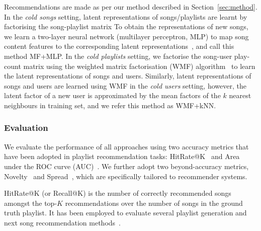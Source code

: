 \begin{itemize}
      Recommendations are made as per our method described in Section~\ref{sec:method}.
      In the \emph{cold songs} setting, latent representations of songs/playlists are learnt by factorising the song-playlist matrix  
      To obtain the representations of new songs, we learn a two-layer neural network (multilayer perceptron, MLP) to map song 
      content features to the corresponding latent representations~\cite{gantner2010learning,van2013deep}, and call this method MF+MLP. 
      In the \emph{cold playlists} setting, we factorise the song-user play-count matrix using the weighted matrix factorisation (WMF) 
      algorithm~\cite{hu2008collaborative,van2013deep} to learn the latent representations of songs and users.
      Similarly, latent representations of songs and users are learned using WMF in the \emph{cold users} setting, however, the latent 
      factor of a new user is approximated by the mean factors of the $k$ nearest neighbours in training set, 
      and we refer this method as WMF+kNN.
\end{itemize}


\subsubsection{Evaluation}
We evaluate the performance of all approaches using two accuracy metrics that have been adopted 
in playlist recommendation tasks:
HitRate@K~\cite{hariri2012context} and Area under the ROC curve (AUC)~\cite{manning2008introIR}.
We further adopt two beyond-accuracy metrics, \ie
Novelty~\cite{zhang2012auralist,schedl2017} and Spread~\cite{kluver2014evaluating},
which are specifically tailored to recommender systems.
%

HitRate@K (or Recall@K) is the number of correctly recommended songs amongst the top-$K$ recommendations over
the number of songs in the ground truth playlist. %
It has been employed to evaluate several playlist generation and next song recommendation
methods~\cite{hariri2012context,bonnin2013evaluating,bonnin2015automated,jannach2015beyond}.

